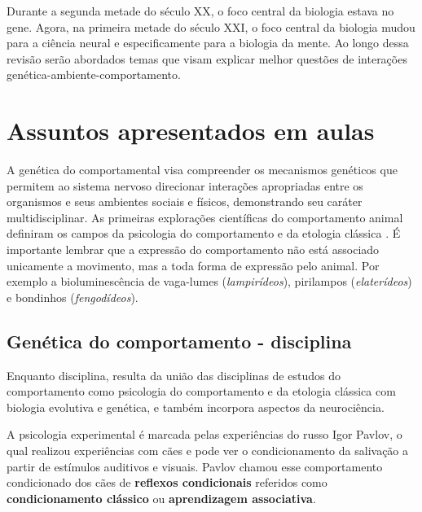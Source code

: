 \documentclass[
	article,			%
	12pt,				%
	oneside,			%
	a4paper,			%
	english,			%
	brazil,				%
	sumario=tradicional
	]{abntex2}
\begin{document}
Durante a segunda metade do século XX, o foco central da biologia estava no gene. Agora, na primeira metade do século XXI, o foco central da biologia mudou para a ciência neural e especificamente para a biologia da mente.
\cite{kandel2000principles} Ao longo dessa revisão serão abordados temas que visam explicar melhor questões de interações genética-ambiente-comportamento.
\section{Assuntos apresentados em aulas}
\label{aulas}
A genética do comportamental visa compreender os mecanismos genéticos que permitem ao sistema nervoso direcionar interações apropriadas entre os organismos e seus ambientes sociais e físicos, demonstrando seu caráter multidisciplinar.
As primeiras explorações científicas do comportamento animal definiram os campos da  psicologia do comportamento e da etologia clássica \cite{anholt2009principles}.
É importante lembrar que a expressão do comportamento não está associado unicamente a movimento, mas a toda forma de expressão pelo animal. Por exemplo a bioluminescência de vaga-lumes (\textit{lampirídeos}), pirilampos (\textit{elaterídeos}) e bondinhos (\textit{fengodídeos}).

\subsection{Genética do comportamento - disciplina}
Enquanto disciplina, resulta da união das disciplinas de estudos do comportamento como  psicologia do comportamento e da etologia clássica com biologia evolutiva e genética, e também incorpora aspectos da neurociência.


A psicologia experimental é marcada pelas experiências do russo Igor Pavlov, o qual realizou experiências com cães e pode ver o condicionamento da salivação a partir de estímulos auditivos e visuais. Pavlov chamou esse comportamento condicionado dos cães de \textbf{reflexos condicionais} referidos como \textbf{condicionamento clássico} ou \textbf{aprendizagem associativa}.
\end{document}
